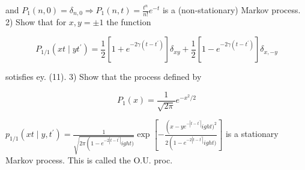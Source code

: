and $P_{1}(n, 0)=\delta_{n, 0} \Rightarrow P_{1}(n, t)=\frac{t^{n}}{n!} e^{-t}$ is a (non-stationary) Markov process.
2) Show that for $x, y= \pm 1$ the function

$$ P_{1 / 1}
\left(x t \mid y t^{\prime}\right)=\frac{1}{2}
\left[1+e^{-2 \gamma\left(t-t^{\prime}\right)}\right] \delta_{x y}+\frac{1}{2}
\left[1-e^{-2 \gamma\left(t-t^{\prime}\right)}\right] \delta_{x,-y} $$

sotisfies ey. (11).
3) Show that the process defined by

$$ P_{1}(x)=\frac{1}{\sqrt{2 \pi}} e^{-x^{2} / 2} $$

$p_{1 / 1}
\left(x t \mid y, t^{\prime}\right)=\frac{1}{\sqrt{2 \pi\left(1-e^{-2\left|t-t^{\prime}\right|}
ight)}} \exp 
\left[-\frac{\left(x-y e^{-\left|t-t^{\prime}\right|}
ight)^{2}}{2\left(1-e^{-2
\left|t-t^{\prime}\right|}
ight)}\right]$ is a stationary Markov process. This is called the O.U. proc.
